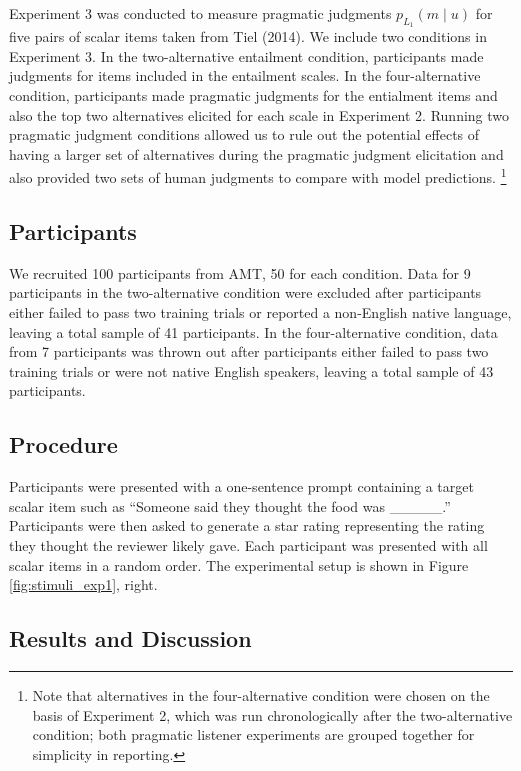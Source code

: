 \documentclass[10pt, letterpaper]{article}
\begin{document}
Experiment 3 was conducted to measure pragmatic judgments
\(p_{L_1}(m \mid u)\) for five pairs of scalar items taken from Tiel
(2014). We include two conditions in Experiment 3. In the
two-alternative entailment condition, participants made judgments for
items included in the entailment scales. In the four-alternative
condition, participants made pragmatic judgments for the entialment
items and also the top two alternatives elicited for each scale in
Experiment 2. Running two pragmatic judgment conditions allowed us to
rule out the potential effects of having a larger set of alternatives
during the pragmatic judgment elicitation and also provided two sets of
human judgments to compare with model predictions.
\footnote{Note that alternatives in the four-alternative condition were chosen on the basis of Experiment 2, which was run chronologically after the two-alternative condition; both pragmatic listener experiments are grouped together for simplicity in reporting.}

\subsection{Participants}\label{participants-2}

We recruited 100 participants from AMT, 50 for each condition. Data for
9 participants in the two-alternative condition were excluded after
participants either failed to pass two training trials or reported a
non-English native language, leaving a total sample of 41 participants.
In the four-alternative condition, data from 7 participants was thrown
out after participants either failed to pass two training trials or were
not native English speakers, leaving a total sample of 43 participants.

\subsection{Procedure}\label{procedure}

Participants were presented with a one-sentence prompt containing a
target scalar item such as ``Someone said they thought the food was
\_\_\_\_\_.'' Participants were then asked to generate a star rating
representing the rating they thought the reviewer likely gave. Each
participant was presented with all scalar items in a random order. The
experimental setup is shown in Figure \ref{fig:stimuli_exp1}, right.

\subsection{Results and Discussion}\label{results-and-discussion-2}
\end{document}
